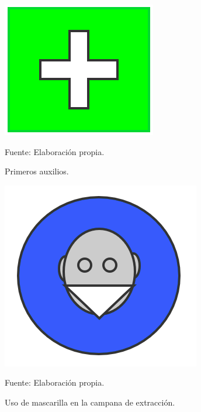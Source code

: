 \documentclass[12pt,letterpaper]{exam}
\begin{document}
\begin{multicols}{2}

\begin{figure}[H]
\centering
\includegraphics[width = \columnwidth]{Señal-2.png}
\caption{Primeros auxilios.}
\begin{center}
Fuente: Elaboración propia.
\end{center}
\label{fig:Señal_1}
\end{figure}


\begin{figure}[H]
\centering
\includegraphics[width = \columnwidth]{Señal-1.png}
\caption{Uso de mascarilla en la campana de extracción.}
\begin{center}
Fuente: Elaboración propia.
\end{center}
\label{fig:Señal_2}
\end{figure}

\end{multicols}

\end{document}
